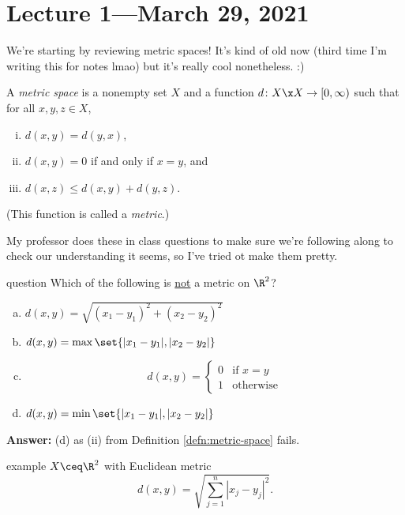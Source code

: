 \documentclass[class=article, crop=false]{standalone}
\begin{document}
\section{Lecture 1---March 29, 2021}

We're starting by reviewing metric spaces! It's kind of old now (third time I'm writing this for notes lmao) but it's really cool nonetheless. :)

\begin{defn}{\label{defn:metric-space}}
  A \emph{metric space} is a nonempty set $X$ and a function $d\colon X \x X \to [0,\infty)$ such that for all $x,y,z \in X$, \begin{enumerate}[(i)]
    \item $d(x,y) = d(y,x)$,
    \item $d(x,y) = 0$ if and only if $x=y$, and
    \item $d(x,z) \leq d(x,y)+d(y,z)$.
  \end{enumerate}
  (This function is called a \emph{metric}.)
\end{defn}

My professor does these in class questions to make sure we're following along to check our understanding it seems, so I've tried ot make them pretty.

\begin{understandingcheck}{question}
  Which of the following is \underline{not} a metric on $\R^2$? \begin{enumerate}[(a)]
    \item $d(x,y) = \sqrt{(x_1-y_1)^2+(x_2-y_2)^2}$
    \item $d(x,y) = \max \set{|x_1-y_1|,|x_2-y_2|}$
    \item
      \[
        d(x,y) = \begin{cases}
          0 & \text{if } x=y \\
          1 & \text{otherwise}
      \end{cases}
      \]
    \item $d(x,y) = \min \set{|x_1-y_1|, |x_2-y_2|}$
  \end{enumerate}

  \textbf{Answer:} (d) as (ii) from Definition \ref{defn:metric-space} fails.
\end{understandingcheck}

\begin{understandingcheck}{example}
  $X \ceq \R^2$ with Euclidean metric
    \[
      d(x,y) = \sqrt{\sum_{j=1}^{n} |x_j-y_j|^2}.
    \]
\end{understandingcheck}
\end{document}
